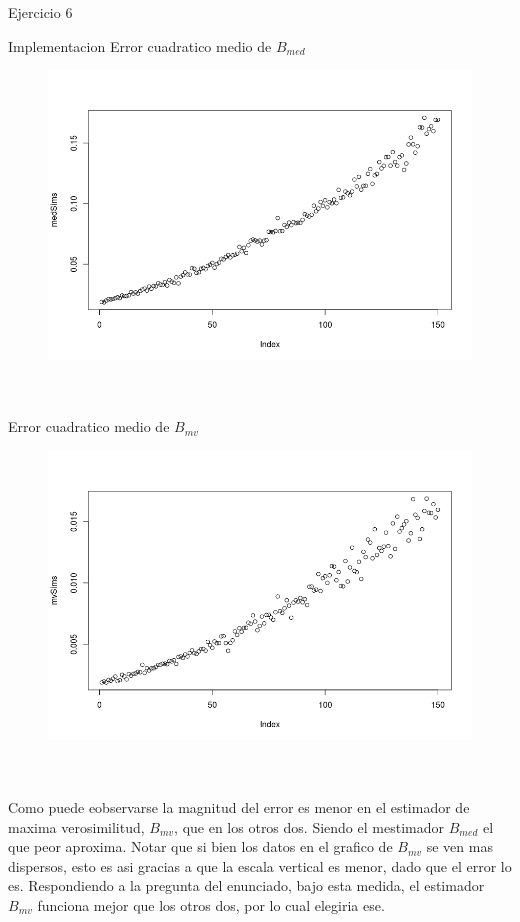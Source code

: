 \begin{section}{Ejercicio 6}
\begin{subsection}{Implementacion}
Error cuadratico medio de $B_{med}$
\begin{figure}[H]
\includegraphics[scale=0.65]{plots/medSims.png}
\centering
\end{figure}
~\\
~\\

Error cuadratico medio de $B_{mv}$
\begin{figure}[H]
\includegraphics[scale=0.65]{plots/mvSims.png}
\centering
\end{figure}
~\\
~\\
Como puede eobservarse la magnitud del error es menor en el estimador de maxima verosimilitud, $B_{mv}$, que en los otros dos. Siendo el mestimador $B_{med}$ el que peor aproxima. Notar que si bien los datos en el grafico de $B_{mv}$ se ven mas dispersos, esto es asi gracias a que la escala vertical es menor, dado que el error lo es.
Respondiendo a la pregunta del enunciado, bajo esta medida, el estimador $B_{mv}$ funciona mejor que los otros dos, por lo cual elegiria ese.

\end{subsection}
\end{section}